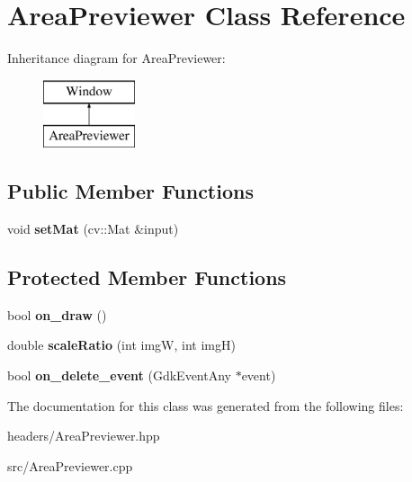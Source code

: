 \hypertarget{classAreaPreviewer}{\section{Area\-Previewer Class Reference}
\label{classAreaPreviewer}
}
Inheritance diagram for Area\-Previewer\-:\begin{figure}[H]
\begin{center}
\leavevmode
\includegraphics[height=2.000000cm]{classAreaPreviewer}
\end{center}
\end{figure}
\subsection*{Public Member Functions}
\begin{DoxyCompactItemize}
\item 
\hypertarget{classAreaPreviewer_a6b58de9ca1e93b329b593b050fa2e2c7}{void {\bfseries set\-Mat} (cv\-::\-Mat \&input)}\label{classAreaPreviewer_a6b58de9ca1e93b329b593b050fa2e2c7}

\end{DoxyCompactItemize}
\subsection*{Protected Member Functions}
\begin{DoxyCompactItemize}
\item 
\hypertarget{classAreaPreviewer_abb64dffa0d4806ec5c86ef89f1aedaa6}{bool {\bfseries on\-\_\-draw} ()}\label{classAreaPreviewer_abb64dffa0d4806ec5c86ef89f1aedaa6}

\item 
\hypertarget{classAreaPreviewer_aba5dd5876ce56a8fc6131b9fc37c47fc}{double {\bfseries scale\-Ratio} (int img\-W, int img\-H)}\label{classAreaPreviewer_aba5dd5876ce56a8fc6131b9fc37c47fc}

\item 
\hypertarget{classAreaPreviewer_a07370cec469cd7e09087f7ea9360864e}{bool {\bfseries on\-\_\-delete\-\_\-event} (Gdk\-Event\-Any $\ast$event)}\label{classAreaPreviewer_a07370cec469cd7e09087f7ea9360864e}

\end{DoxyCompactItemize}


The documentation for this class was generated from the following files\-:\begin{DoxyCompactItemize}
\item 
headers/Area\-Previewer.\-hpp\item 
src/Area\-Previewer.\-cpp\end{DoxyCompactItemize}
